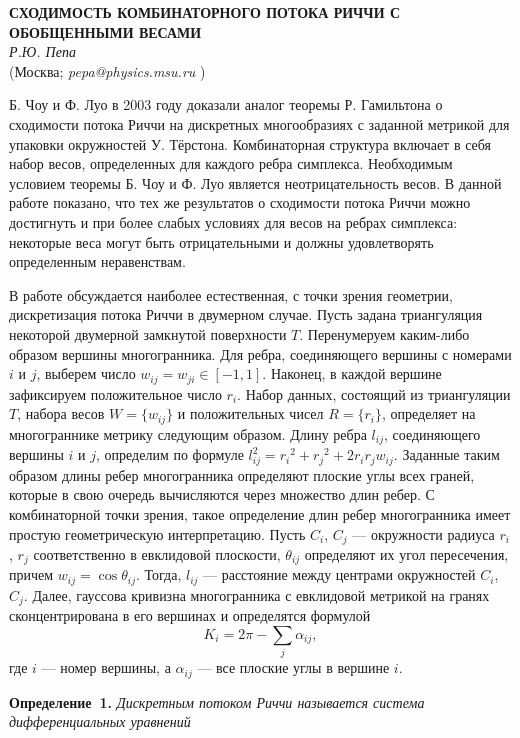 \begin{center}{ \bf СХОДИМОСТЬ КОМБИНАТОРНОГО ПОТОКА РИЧЧИ С ОБОБЩЕННЫМИ ВЕСАМИ}\\
{\it Р.Ю. Пепа } \\
(Москва; {\it pepa@physics.msu.ru} )
\end{center}


Б. Чоу и Ф. Луо в 2003 году доказали аналог теоремы Р. Гамильтона о сходимости потока Риччи на дискретных многообразиях с заданной метрикой для  упаковки окружностей У. Тёрстона. Комбинаторная структура включает в себя набор весов, определенных для каждого ребра симплекса. Необходимым условием теоремы Б. Чоу и Ф. Луо является неотрицательность весов. В данной работе показано, что тех же результатов о сходимости потока Риччи можно достигнуть и при более слабых условиях для весов на ребрах симплекса: некоторые веса могут быть отрицательными и должны удовлетворять определенным неравенствам.

В работе обсуждается наиболее
естественная, с точки
зрения геометрии, дискретизация потока
Риччи в двумерном случае.
Пусть задана триангуляция некоторой
двумерной замкнутой поверхности $T$.
Перенумеруем каким-либо образом вершины
многогранника. Для ребра,
соединяющего вершины с номерами $i$ и $j$,
выберем число $ w_{ij} =
w_{ji} \in [-1,1]$. Наконец, в каждой вершине
зафиксируем
положительное число $r_i$. Набор данных,
состоящий из триангуляции
$T$, набора весов $W = \{ w_{ij} \}$ и положительных чисел
$R = \{ r_i \}$, определяет на многограннике
метрику следующим
образом. Длину ребра $l_{ij}$, соединяющего
вершины $i$ и $j$,
определим по формуле $l_{ij}^2 = {r_i}^2 + {r_j}^2 +
2r_i
r_jw_{ij}$. Заданные таким образом длины
ребер многогранника
определяют плоские углы всех граней, которые в свою очередь вычисляются через множество длин ребер.
С комбинаторной точки зрения, такое определение длин ребер многогранника имеет простую геометрическую интерпретацию. Пусть  $C_i$, $C_j$ --- окружности радиуса $r_i$, $r_j$ соответственно  в евклидовой плоскости, $ \theta_{ij} $ определяют их угол пересечения, причем $ w_{ij} = \cos \theta_{ij} $. Тогда, $l_{ij}$ --- расстояние между центрами окружностей $C_i$, $C_j$.
Далее, гауссова кривизна многогранника с
евклидовой метрикой на
гранях сконцентрирована в его вершинах и
определятся формулой
$$
K_i = 2 \pi - \sum_{j} \alpha_{ij},
$$
где $i$ --- номер вершины, а $\alpha_{ij}$ --- все
плоские углы в
вершине $i$.

\textbf{Определение~1.} {\it
Дискретным потоком Риччи называется
система дифференциальных уравнений}


